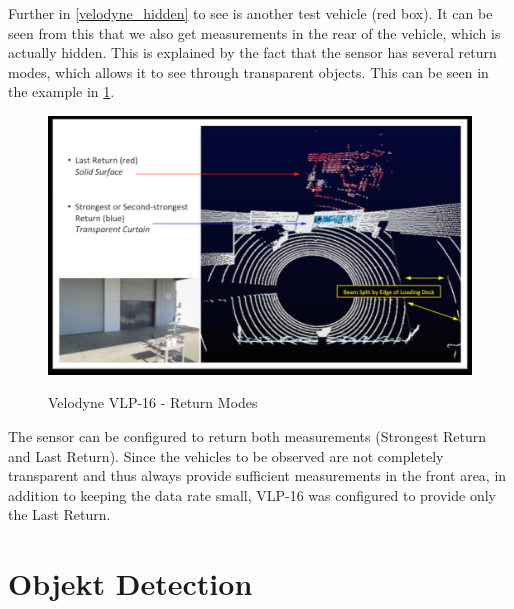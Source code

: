 \documentclass[11pt,oneside,openright]{mpreport}
\begin{document}
Further in \cref{velodyne_hidden} to see is another test vehicle (red box). It can be seen from this that we also get measurements in the rear of the vehicle, which is actually hidden.
This is explained by the fact that the sensor has several return modes, which allows it to see through transparent objects. This can be seen in the example in \cref{vel_trans}.

\begin{figure}[!ht]
\caption{Velodyne VLP-16 - Return Modes \cite{manVEL}}
\includegraphics[width=\textwidth]{bilder/velodyne_trans.png}
\label{vel_trans}
\end{figure}


The sensor can be configured to return both measurements (Strongest Return and Last Return). Since the vehicles to be observed are not completely transparent and thus 
always provide sufficient measurements in the front area, in addition to keeping the data rate small, VLP-16 was configured to provide only the Last Return.



\chapter{Objekt Detection}
\end{document}
